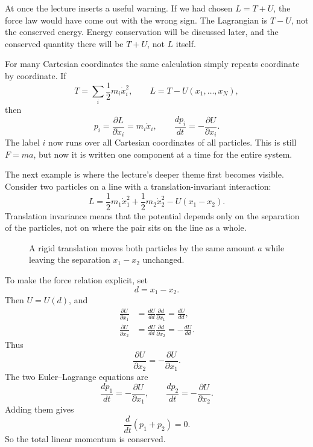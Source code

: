At once the lecture inserts a useful warning. If we had chosen \(L=T+U\), the force law would have come out with the wrong sign. The Lagrangian is \(T-U\), not the conserved energy. Energy conservation will be discussed later, and the conserved quantity there will be \(T+U\), not \(L\) itself.

For many Cartesian coordinates the same calculation simply repeats coordinate by coordinate. If
\begin{equation}
T=\sum_i \frac12 m_i \dot x_i^2,
\qquad
L=T-U(x_1,\dots,x_N),
\end{equation}
then
\begin{equation}
p_i=\frac{\partial L}{\partial \dot x_i}=m_i\dot x_i,
\qquad
\frac{dp_i}{dt}=-\frac{\partial U}{\partial x_i}.
\end{equation}
The label \(i\) now runs over all Cartesian coordinates of all particles. This is still \(F=ma\), but now it is written one component at a time for the entire system.

The next example is where the lecture's deeper theme first becomes visible. Consider two particles on a line with a translation-invariant interaction:
\begin{equation}
L=\frac12 m_1\dot x_1^2+\frac12 m_2\dot x_2^2-U(x_1-x_2).
\end{equation}
Translation invariance means that the potential depends only on the separation of the particles, not on where the pair sits on the line as a whole.

\begin{figure}
\centering
{}
\caption{A rigid translation moves both particles by the same amount \(a\) while leaving the separation \(x_1-x_2\) unchanged.}
\end{figure}

To make the force relation explicit, set
\[
d=x_1-x_2.
\]
Then \(U=U(d)\), and
\begin{align}
\frac{\partial U}{\partial x_1}
&=
\frac{dU}{dd}\frac{\partial d}{\partial x_1}
=
\frac{dU}{dd},\\
\frac{\partial U}{\partial x_2}
&=
\frac{dU}{dd}\frac{\partial d}{\partial x_2}
=
-\frac{dU}{dd}.
\end{align}
Thus
\begin{equation}
\frac{\partial U}{\partial x_2}=-\frac{\partial U}{\partial x_1}.
\end{equation}
The two Euler--Lagrange equations are
\begin{equation}
\frac{dp_1}{dt}=-\frac{\partial U}{\partial x_1},
\qquad
\frac{dp_2}{dt}=-\frac{\partial U}{\partial x_2}.
\end{equation}
Adding them gives
\begin{equation}
\frac{d}{dt}(p_1+p_2)=0.
\end{equation}
So the total linear momentum is conserved.

